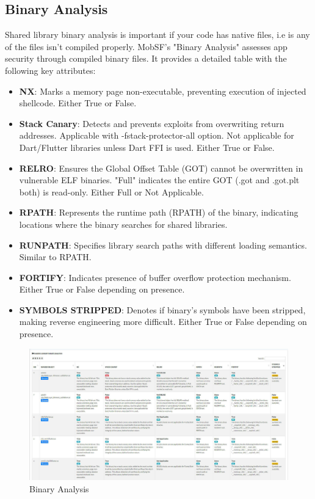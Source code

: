 \documentclass{report}
\begin{document}
\subsection{Binary Analysis}
Shared library binary analysis is important if your code has native files, i.e is any of the files isn't compiled properly. MobSF's "Binary Analysis" assesses app security through compiled binary files. It provides a detailed table with the following key attributes:
\begin{itemize}
    \item \textbf{NX}: Marks a memory page non-executable, preventing execution of injected shellcode. Either True or False.
    \item \textbf{Stack Canary}: Detects and prevents exploits from overwriting return addresses. Applicable with -fstack-protector-all option. Not applicable for Dart/Flutter libraries unless Dart FFI is used. Either True or False.
    \item \textbf{RELRO}: Ensures the Global Offset Table (GOT) cannot be overwritten in vulnerable ELF binaries. "Full" indicates the entire GOT (.got and .got.plt both) is read-only. Either Full or Not Applicable.
    \item \textbf{RPATH}: Represents the runtime path (RPATH) of the binary, indicating locations where the binary searches for shared libraries.
    \item \textbf{RUNPATH}: Specifies library search paths with different loading semantics. Similar to RPATH.
    \item \textbf{FORTIFY}: Indicates presence of buffer overflow protection mechanism. Either True or False depending on presence.
    \item \textbf{SYMBOLS STRIPPED}: Denotes if binary's symbols have been stripped, making reverse engineering more difficult. Either True or False depending on presence.
\end{itemize}

\begin{figure}[hbt!]
    \centering
    \includegraphics[width=1\textwidth]{images/binaryanalysis.jpg}
    \caption{Binary Analysis}
    \label{fig:example}
\end{figure}
\FloatBarrier
\end{document}
